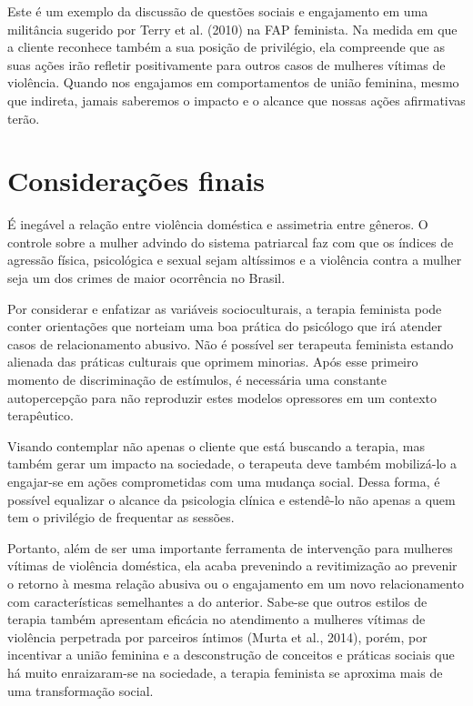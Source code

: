 Este é um exemplo da discussão de questões sociais e engajamento em uma militância sugerido por Terry et al. (2010) na FAP feminista. Na medida em que a cliente reconhece também a sua posição de privilégio, ela compreende que as suas ações irão refletir positivamente para outros casos de mulheres vítimas de violência. Quando nos engajamos em comportamentos de união feminina, mesmo que indireta, jamais saberemos o impacto e o alcance que nossas ações afirmativas terão. 

\section*{Considerações finais}

É inegável a relação entre violência doméstica e assimetria entre gêneros. O controle sobre a mulher advindo do sistema patriarcal faz com que os índices de agressão física, psicológica e sexual sejam altíssimos e a violência contra a mulher seja um dos crimes de maior ocorrência no Brasil.

Por considerar e enfatizar as variáveis socioculturais, a terapia feminista pode conter orientações que norteiam uma boa prática do psicólogo que irá atender casos de relacionamento abusivo. Não é possível ser terapeuta feminista estando alienada das práticas culturais que oprimem minorias. Após esse primeiro momento de discriminação de estímulos, é necessária uma constante autopercepção para não reproduzir estes modelos opressores em um contexto terapêutico.

Visando contemplar não apenas o cliente que está buscando a terapia, mas também gerar um impacto na sociedade, o terapeuta deve também mobilizá-lo a engajar-se em ações comprometidas com uma mudança social. Dessa forma, é possível equalizar o alcance da psicologia clínica e estendê-lo não apenas a quem tem o privilégio de frequentar as sessões.

Portanto, além de ser uma importante ferramenta de intervenção para mulheres vítimas de violência doméstica, ela acaba prevenindo a revitimização ao prevenir o retorno à mesma relação abusiva ou o engajamento em um novo relacionamento com características semelhantes a do anterior. Sabe-se que outros estilos de terapia também apresentam eficácia no atendimento a mulheres vítimas de violência perpetrada por parceiros íntimos (Murta et al., 2014), porém, por incentivar a união feminina e a desconstrução de conceitos e práticas sociais que há muito enraizaram-se na sociedade, a terapia feminista se aproxima mais de uma transformação social.

